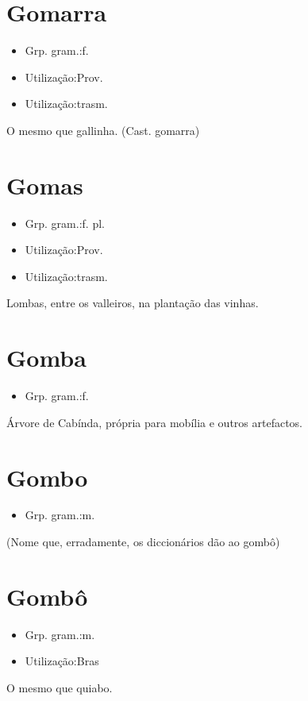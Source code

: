 \section{Gomarra}
\begin{itemize}
\item {Grp. gram.:f.}
\end{itemize}
\begin{itemize}
\item {Utilização:Prov.}
\end{itemize}
\begin{itemize}
\item {Utilização:trasm.}
\end{itemize}
O mesmo que \textunderscore gallinha\textunderscore .
(Cast. \textunderscore gomarra\textunderscore )
\section{Gomas}
\begin{itemize}
\item {Grp. gram.:f. pl.}
\end{itemize}
\begin{itemize}
\item {Utilização:Prov.}
\end{itemize}
\begin{itemize}
\item {Utilização:trasm.}
\end{itemize}
Lombas, entre os valleiros, na plantação das vinhas.
\section{Gomba}
\begin{itemize}
\item {Grp. gram.:f.}
\end{itemize}
Árvore de Cabínda, própria para mobília e outros artefactos.
\section{Gombo}
\begin{itemize}
\item {Grp. gram.:m.}
\end{itemize}
(Nome que, erradamente, os diccionários dão ao gombô)
\section{Gombô}
\begin{itemize}
\item {Grp. gram.:m.}
\end{itemize}
\begin{itemize}
\item {Utilização:Bras}
\end{itemize}
O mesmo que \textunderscore quiabo\textunderscore .
